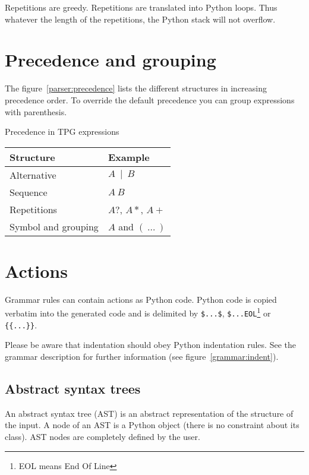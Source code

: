Repetitions are greedy.
Repetitions are translated into Python loops.
Thus whatever the length of the repetitions, the Python stack will not overflow.

\section{Precedence and grouping}

The figure~\ref{parser:precedence} lists the different structures in increasing precedence order.
To override the default precedence you can group expressions with parenthesis.

\begin{tableau}
\caption{Precedence in TPG expressions}                         \label{parser:precedence}
\begin{tabular}{| l | l |}
\hline
    Structure           & Example \\
\hline
\hline
    Alternative         & $A~\mid~B$ \\
\hline
    Sequence            & $A~B$ \\
\hline
    Repetitions         & $A?$, $A*$, $A+$ \\
\hline
    Symbol and grouping & $A$ and $(~\ldots~)$ \\
\hline
\end{tabular}
\end{tableau}

\section{Actions}

Grammar rules can contain actions as Python code.
Python code is copied verbatim into the generated code and
is delimited by \verb!$...$!, \verb!$...EOL!\footnote{EOL means End Of Line} or \verb!{{...}}!.

Please be aware that indentation should obey Python indentation rules.
See the grammar description for further information (see figure~\ref{grammar:indent}).

\subsection{Abstract syntax trees}                              \label{parser:AST}

An abstract syntax tree (AST) is an abstract representation of the structure of the input.
A node of an AST is a Python object (there is no constraint about its class).
AST nodes are completely defined by the user.

